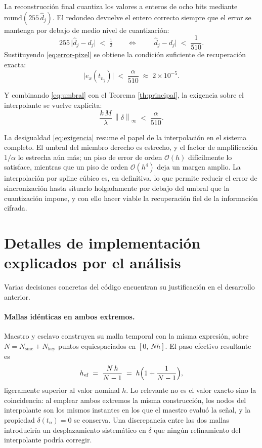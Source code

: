 \documentclass[12pt,a4paper]{article}
\newcommand{\dnorm}[1]{\left\lVert #1 \right\rVert}
\newcommand{\infnorm}[1]{\dnorm{#1}_{\infty}}
\begin{document}
La reconstrucción final cuantiza los valores a enteros de ocho bits mediante
$\mathrm{round}(255\,\hat{d}_j)$. El redondeo devuelve el entero correcto siempre
que el error se mantenga por debajo de medio nivel de cuantización:
\[
  255\,\bigl\lvert \hat{d}_j - d_j \bigr\rvert \;<\; \tfrac{1}{2}
  \qquad\Longleftrightarrow\qquad
  \bigl\lvert \hat{d}_j - d_j \bigr\rvert \;<\; \frac{1}{510}.
\]
Sustituyendo \eqref{eq:error-pixel} se obtiene la condición suficiente de
recuperación exacta:
\begin{equation}
\label{eq:umbral}
  \bigl\lvert e_x(t_{n_j}) \bigr\rvert \;<\; \frac{\alpha}{510}
  \;\approx\; 2\times 10^{-5}.
\end{equation}

Y combinando \eqref{eq:umbral} con el Teorema \ref{th:principal}, la exigencia
sobre el interpolante se vuelve explícita:
\begin{equation}
\label{eq:exigencia}
  \frac{k\,M}{\lambda}\,\infnorm{\delta} \;<\; \frac{\alpha}{510}.
\end{equation}

La desigualdad \eqref{eq:exigencia} resume el papel de la interpolación en el
sistema completo. El umbral del miembro derecho es estrecho, y el factor de
amplificación $1/\alpha$ lo estrecha aún más; un piso de error de orden
$\mathcal{O}(h)$ difícilmente lo satisface, mientras que un piso de orden
$\mathcal{O}(h^{4})$ deja un margen amplio. La interpolación por spline cúbico
es, en definitiva, lo que permite reducir el error de sincronización hasta situarlo
holgadamente por debajo del umbral que la cuantización impone, y con ello hacer
viable la recuperación fiel de la información cifrada.

\section{Detalles de implementación explicados por el análisis}
\label{sec:detalles}

Varias decisiones concretas del código encuentran su justificación en el desarrollo
anterior.

\paragraph{Mallas idénticas en ambos extremos.}
Maestro y esclavo construyen su malla temporal con la misma expresión, sobre
$N=N_{\mathrm{sinc}}+N_{\mathrm{key}}$ puntos equiespaciados en $[0,\,Nh]$. El paso
efectivo resultante es
\[
  h_{\mathrm{ef}} \;=\; \frac{N\,h}{N-1} \;=\; h\Bigl(1+\frac{1}{N-1}\Bigr),
\]
ligeramente superior al valor nominal $h$. Lo relevante no es el valor exacto sino
la coincidencia: al emplear ambos extremos la misma construcción, los nodos del
interpolante son los mismos instantes en los que el maestro evaluó la señal, y la
propiedad $\delta(t_n)=0$ se conserva. Una discrepancia entre las dos mallas
introduciría un desplazamiento sistemático en $\delta$ que ningún refinamiento del
interpolante podría corregir.
\end{document}
